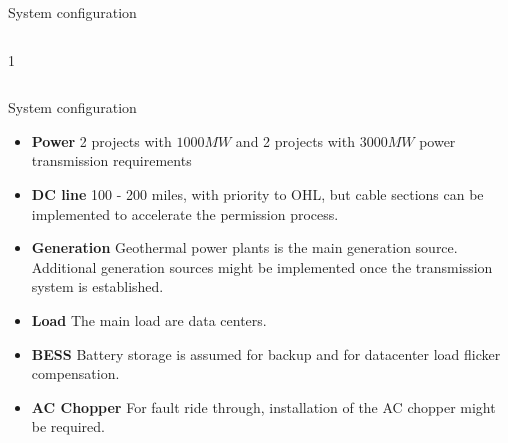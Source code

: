 

\begin{frame}{System configuration}
  \begin{columns}[c,onlytextwidth]
    \begin{column}{1\textwidth}
      \centering

      \end{column}
  \end{columns}
\end{frame}


\begin{frame}{System configuration}
  \begin{itemize}
    \setlength{\itemsep}{0.5em}
    \item \textbf{Power} 2 projects with $1000MW$ and 2 projects with $3000MW$ power transmission requirements
    \item \textbf{DC line} 100 - 200 miles, with priority to OHL, but cable sections can be implemented to accelerate the permission process.
    \item \textbf{Generation} Geothermal power plants is the main generation source. Additional generation sources might be implemented once the transmission system is established.
    \item \textbf{Load} The main load are data centers.
    \item \textbf{BESS} Battery storage is assumed for backup and for datacenter load flicker compensation.
    \item \textbf{AC Chopper} For fault ride through, installation of the AC chopper might be required.
  \end{itemize}
\end{frame}


